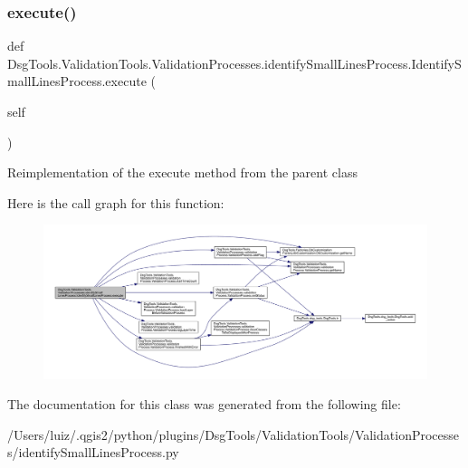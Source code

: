 \subsubsection{\texorpdfstring{execute()}{execute()}}
{\footnotesize\ttfamily def Dsg\+Tools.\+Validation\+Tools.\+Validation\+Processes.\+identify\+Small\+Lines\+Process.\+Identify\+Small\+Lines\+Process.\+execute (\begin{DoxyParamCaption}\item[{}]{self }\end{DoxyParamCaption})}

\begin{DoxyVerb}Reimplementation of the execute method from the parent class
\end{DoxyVerb}
 Here is the call graph for this function\+:
\nopagebreak
\begin{figure}[H]
\begin{center}
\leavevmode
\includegraphics[width=350pt]{class_dsg_tools_1_1_validation_tools_1_1_validation_processes_1_1identify_small_lines_process_1_1_identify_small_lines_process_a743a9e6cc2e65c5b0b2c990370c06969_cgraph}
\end{center}
\end{figure}


The documentation for this class was generated from the following file\+:\begin{DoxyCompactItemize}
\item 
/\+Users/luiz/.\+qgis2/python/plugins/\+Dsg\+Tools/\+Validation\+Tools/\+Validation\+Processes/identify\+Small\+Lines\+Process.\+py\end{DoxyCompactItemize}
